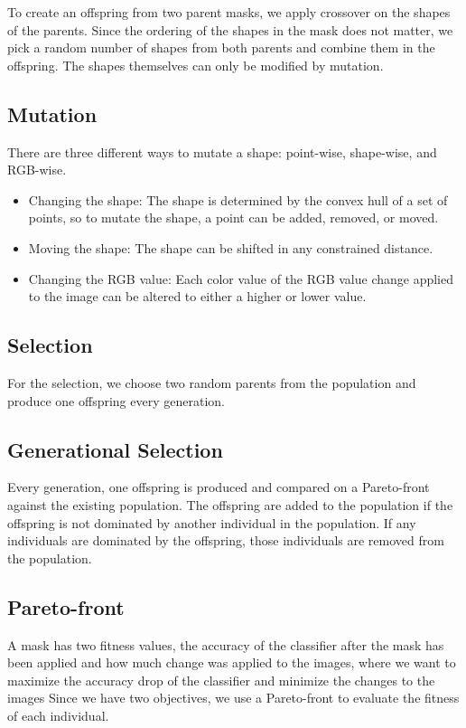 \documentclass[conference]{IEEEtran}
\begin{document}
To create an offspring from two parent masks, we apply crossover on the shapes of the parents.
Since the ordering of the shapes in the mask does not matter, we pick a random number of shapes from both parents and combine them in the offspring.
The shapes themselves can only be modified by mutation.

\subsection{Mutation}

There are three different ways to mutate a shape: point-wise, shape-wise, and RGB-wise.

\begin{itemize}
\item{Changing the shape}: The shape is determined by the convex hull of a set of points, so to mutate the shape, a point can be added, removed, or moved.
\item {Moving the shape}: The shape can be shifted in any constrained distance.
\item {Changing the RGB value}: Each color value of the  RGB value change applied to the image can be altered to either a higher or lower value.
\end{itemize}

\subsection{Selection}
For the selection, we choose two random parents from the population and produce one offspring every generation.

\subsection{Generational Selection}

Every generation, one offspring is produced and compared on a Pareto-front against the existing population. 
The offspring are added to the population if the offspring is not dominated by another individual in the population.
If any individuals are dominated by the offspring, those individuals are removed from the population.

\subsection{Pareto-front}

A mask has two fitness values, the accuracy of the classifier after the mask has been applied and how much change was applied to the images, where we want to maximize the accuracy drop of the classifier and minimize the changes to the images
Since we have two objectives, we use a Pareto-front to evaluate the fitness of each individual. 
\end{document}

